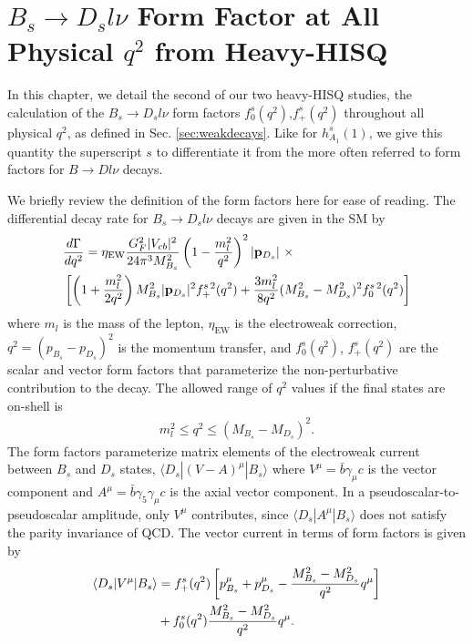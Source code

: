 ﻿\chapter{$B_s\to D_sl\nu$ Form Factor at All Physical $q^2$ from Heavy-HISQ}
\label{chap:BsDs}

In this chapter, we detail the second of our two heavy-HISQ studies, the calculation of the $B_s\to D_sl\nu$ form factors $f^s_0(q^2)$,$f^s_+(q^2)$ throughout all physical $q^2$, as defined in Sec. \ref{sec:weakdecays}. Like for $h_{A_1}^s(1)$, we give this quantity the superscript $s$ to differentiate it from the more often referred to form factors for $B\to Dl\nu$ decays.

We briefly review the definition of the form factors here for ease of reading. The differential decay rate for $B_s\to D_s l \nu$ decays are given in the SM by
\begin{align}
  &{d\Gamma\over dq^2} = \eta_{\text{EW}} { G_F^2 |V_{cb}|^2\over 24 \pi^3 M_{B_s}^2 } \left( 1 - {m_l^2\over q^2}\right)^2 |{\bf{p}}_{D_s}| \,\,\times \\
  \label{eq:branchingfraction}
  &\left[ \left( 1 + {m_l^2\over 2q^2}\right) M_{B_s}^2 |{\bf{p}}_{D_s}|^2 f_+^{s\,2}(q^2) + {3m_l^2\over 8q^2} (M_{B_s}^2-M_{D_s}^2)^2 f_0^{s\,2}(q^2) \right] \nonumber
\end{align}
where $m_l$ is the mass of the lepton, $\eta_{\text{EW}}$ is the electroweak correction, $q^2 = (p_{B_s} - p_{D_s})^2$ is the momentum transfer, and $f_0^s(q^2)$, $f_+^s(q^2)$ are the scalar and vector form factors that parameterize the non-perturbative contribution to the decay. The allowed range of $q^2$ values if the final states are on-shell is
\begin{align}
  m_l^2 \leq q^2 \leq (M_{B_s}-M_{D_s})^2.
\end{align}
The form factors parameterize matrix elements of the electroweak current between $B_s$ and $D_s$ states, $\langle D_s | (V-A)^{\mu} | B_s \rangle$ where $V^{\mu}=\bar{b}\gamma_{\mu}c$ is the vector component and $A^{\mu}=\bar{b}\gamma_5\gamma_{\mu} c$ is the axial vector component. In a pseudoscalar-to-pseudoscalar amplitude, only $V^{\mu}$ contributes, since $\langle D_s | A^{\mu} | B_s \rangle$ does not satisfy the parity invariance of QCD. The vector current in terms of form factors is given by
\begin{align}
  \langle D_s | V^{\mu} | B_s \rangle &= f_+^s(q^2) \left[ p_{B_s}^{\mu} + p_{D_s}^{\mu} - {M_{B_s}^2 - M_{D_s}^2 \over q^2} q^{\mu} \right] \nonumber \\
  &+ f_0^s(q^2) { M_{B_s}^2 - M_{D_s}^2 \over q^2} q^{\mu}.
  \label{eq:vectorcurrent}
\end{align}
